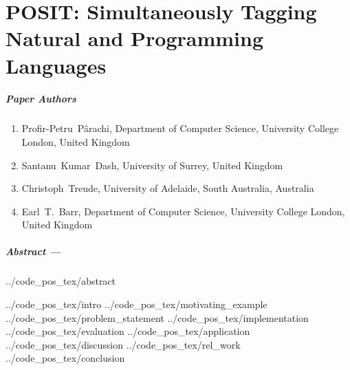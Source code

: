 \chapter{POSIT: Simultaneously Tagging Natural and Programming Languages}
\label{chapter:posit}

\renewcommand{\ourtool}{\textsc{POSIT}\xspace}
\renewcommand{\Ourtool}{\textsc{POSIT}\xspace}
\newcommand{\projurl}{\url{https://github.com/PPPI/POSIT}\xspace}

\paragraph{Paper Authors}
\begin{enumerate}
    \item[] Profir-Petru~P\^arachi, Department of Computer Science, University College London, United Kingdom
    \item[] Santanu~Kumar~Dash, University of Surrey, United Kingdom
    \item[] Christoph~Treude, University of Adelaide, South Australia, Australia
    \item[] Earl~T.~Barr, Department of Computer Science, University College London, United Kingdom
\end{enumerate}

\paragraph{Abstract ---}
{../code_pos_tex/abstract}

{../code_pos_tex/intro}
{../code_pos_tex/motivating_example}
{../code_pos_tex/problem_statement}
{../code_pos_tex/implementation}
{../code_pos_tex/evaluation}
{../code_pos_tex/application}
{../code_pos_tex/discussion}
{../code_pos_tex/rel_work}
{../code_pos_tex/conclusion}